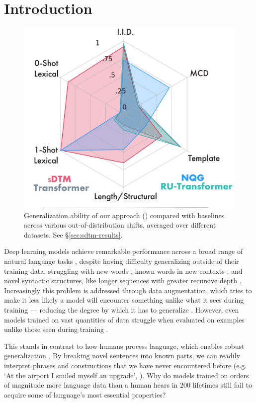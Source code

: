 \section{Introduction}

\begin{figure}[t]
    \centering
    \includegraphics[width=.5\linewidth]{images/sdtm/tight_radar/radar_integrated_legend.png}
    \caption{Generalization ability of our approach (\sdtm) compared with baselines across various out-of-distribution shifts, averaged over different datasets. See \S \ref{sec:sdtm-results}.}
    \label{fig:enter-label}
\end{figure}


Deep learning models achieve remarkable performance across a broad range of natural language tasks \citep{vaswani2017attention}, despite having difficulty generalizing outside of their training data, struggling with new words \citep{Lake_2018_GeneralizationSystematicityCompositional}, known words in new contexts \citep{keysers2020measuring}, and novel syntactic structures, like longer sequences with greater recursive depth \citep{kim_cogs_2020, li_slog_2023}. Increasingly this problem is addressed through data augmentation, which tries to make it less likely a model will encounter something unlike what it sees during training --- reducing the degree by which it has to generalize \citep{andreas_good-enough_2020, devlin2019bert,  guo_sequence-level_2020}. However, even models trained on vast quantities of data struggle when evaluated on examples unlike those seen during training \citep{najoung}.


This stands in contrast to how humans process language, which enables robust generalization \citep{pinker2003language}. By breaking novel sentences into known parts, we can readily interpret phrases and constructions that we have never encountered before (e.g. `At the airport I smiled myself an upgrade', \citep{goldberg_constructions_2006}). Why do models trained on orders of magnitude more language data than a human hears in 200 lifetimes \citep{Griffiths2020UnderstandingHI} still fail to acquire some of language's most essential properties?

